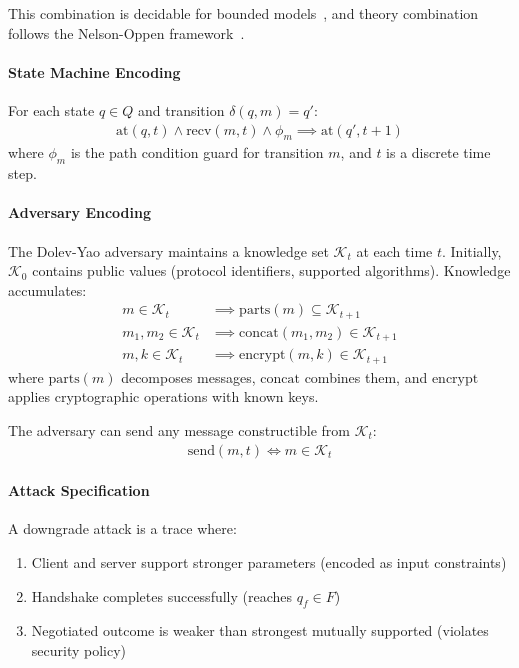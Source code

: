 \documentclass[10pt,twocolumn]{article}
\begin{document}
This combination is decidable for bounded models~\cite{barrett2009smt}, and theory combination follows the Nelson-Oppen framework~\cite{nelson1979simplification}.

\paragraph{State Machine Encoding}
For each state $q \in Q$ and transition $\delta(q, m) = q'$:
\begin{align}
\text{at}(q, t) \land \text{recv}(m, t) \land \phi_m \implies \text{at}(q', t+1)
\end{align}
where $\phi_m$ is the path condition guard for transition $m$, and $t$ is a discrete time step.

\paragraph{Adversary Encoding}
The Dolev-Yao adversary maintains a knowledge set $\mathcal{K}_t$ at each time $t$. Initially, $\mathcal{K}_0$ contains public values (protocol identifiers, supported algorithms). Knowledge accumulates:
\begin{align}
m \in \mathcal{K}_t &\implies \text{parts}(m) \subseteq \mathcal{K}_{t+1} \\
m_1, m_2 \in \mathcal{K}_t &\implies \text{concat}(m_1, m_2) \in \mathcal{K}_{t+1} \\
m, k \in \mathcal{K}_t &\implies \text{encrypt}(m, k) \in \mathcal{K}_{t+1}
\end{align}
where $\text{parts}(m)$ decomposes messages, $\text{concat}$ combines them, and $\text{encrypt}$ applies cryptographic operations with known keys.

The adversary can send any message constructible from $\mathcal{K}_t$:
\begin{align}
\text{send}(m, t) \iff m \in \mathcal{K}_t
\end{align}

\paragraph{Attack Specification}
A downgrade attack is a trace where:
\begin{enumerate}[leftmargin=*,noitemsep]
\item Client and server support stronger parameters (encoded as input constraints)
\item Handshake completes successfully (reaches $q_f \in F$)
\item Negotiated outcome is weaker than strongest mutually supported (violates security policy)
\end{enumerate}
\end{document}
